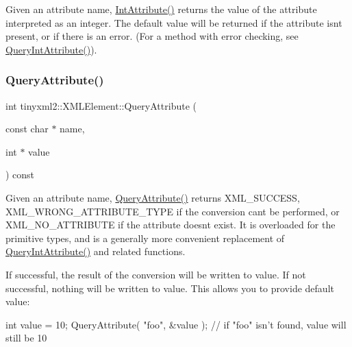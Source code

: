 Given an attribute name, \mbox{\hyperlink{classtinyxml2_1_1_x_m_l_element_a95a89b13bb14a2d4655e2b5b406c00d4}{Int\+Attribute()}} returns the value of the attribute interpreted as an integer. The default value will be returned if the attribute isn\textquotesingle{}t present, or if there is an error. (For a method with error checking, see \mbox{\hyperlink{classtinyxml2_1_1_x_m_l_element_a8a78bc1187c1c45ad89f2690eab567b1}{Query\+Int\+Attribute()}}). \mbox{\label{classtinyxml2_1_1_x_m_l_element_a042fc30504347b84a56cf863ad528a4f}} 
\subsubsection{\texorpdfstring{Query\+Attribute()}{QueryAttribute()}}
{\footnotesize\ttfamily int tinyxml2\+::\+X\+M\+L\+Element\+::\+Query\+Attribute (\begin{DoxyParamCaption}\item[{const char $\ast$}]{name,  }\item[{int $\ast$}]{value }\end{DoxyParamCaption}) const\hspace{0.3cm}{\ttfamily [inline]}}

Given an attribute name, \mbox{\hyperlink{classtinyxml2_1_1_x_m_l_element_a042fc30504347b84a56cf863ad528a4f}{Query\+Attribute()}} returns X\+M\+L\+\_\+\+S\+U\+C\+C\+E\+SS, X\+M\+L\+\_\+\+W\+R\+O\+N\+G\+\_\+\+A\+T\+T\+R\+I\+B\+U\+T\+E\+\_\+\+T\+Y\+PE if the conversion can\textquotesingle{}t be performed, or X\+M\+L\+\_\+\+N\+O\+\_\+\+A\+T\+T\+R\+I\+B\+U\+TE if the attribute doesn\textquotesingle{}t exist. It is overloaded for the primitive types, and is a generally more convenient replacement of \mbox{\hyperlink{classtinyxml2_1_1_x_m_l_element_a8a78bc1187c1c45ad89f2690eab567b1}{Query\+Int\+Attribute()}} and related functions.

If successful, the result of the conversion will be written to \textquotesingle{}value\textquotesingle{}. If not successful, nothing will be written to \textquotesingle{}value\textquotesingle{}. This allows you to provide default value\+:

\begin{DoxyVerb}int value = 10;
QueryAttribute( "foo", &value );        // if "foo" isn't found, value will still be 10
\end{DoxyVerb}
 \mbox{\label{classtinyxml2_1_1_x_m_l_element_a8a78bc1187c1c45ad89f2690eab567b1}} 
